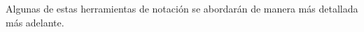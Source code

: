 \begin{note}
Algunas de estas herramientas de notación se abordarán de manera más detallada más adelante.
\end{note}

\begin{comment}
En el capítulo 1 presentaremos algunos preliminares que se pueden consultar en el contenido y estudiaremos un poco la función $\zeta(s)$ y su derivada logarítmica $\dfrac{\zeta^{\prime}(s)}{\zeta(s)}$, veremos que el TNP es equivalente a la afirmación $\psi(x)\thicksim x$, función que también estudiaremos allí. El capítulo 2 será para presentar una prueba del teorema de Dirichlet, las ideas subyacentes y los preliminares de la  prueba también se desarrollarán allí, en los capítulos 3 y 4 se desarrollarán las pruebas del TNP y el TNP sobre progresiones aritmética, estudiaremos la teoría Tauberiana, que nos permitirá dar una prueba sencilla del TNP y donde casi toda  la variable compleja estará escondida en el teorema de Wiener-Ikehara que también presentaremos allí junto con algunas aplicaciones.
\end{comment}